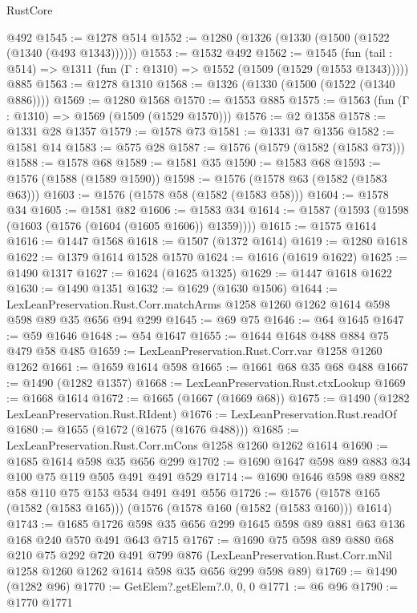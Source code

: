 \begin{lexlean}{RustCore}
\begin{coremodule}
    @492
@1545 := @1278 @514
@1552 := @1280 (@1326 (@1330 (@1500 (@1522 (@1340 (@493 @1343))))))
@1553 := @1532 @492
@1562 := @1545
    (fun (tail : @514) => @1311 (fun (Γ : @1310) => @1552 (@1509 (@1529 (@1553 @1343)))))
    @885
@1563 := @1278 @1310
@1568 := @1326 (@1330 (@1500 (@1522 (@1340 @886))))
@1569 := @1280 @1568
@1570 := @1553 @885
@1575 := @1563 (fun (Γ : @1310) => @1569 (@1509 (@1529 @1570)))
@1576 := @2 @1358
@1578 := @1331 @28 @1357
@1579 := @1578 @73
@1581 := @1331 @7 @1356
@1582 := @1581 @14
@1583 := @575 @28
@1587 := @1576 (@1579 (@1582 (@1583 @73)))
@1588 := @1578 @68
@1589 := @1581 @35
@1590 := @1583 @68
@1593 := @1576 (@1588 (@1589 @1590))
@1598 := @1576 (@1578 @63 (@1582 (@1583 @63)))
@1603 := @1576 (@1578 @58 (@1582 (@1583 @58)))
@1604 := @1578 @34
@1605 := @1581 @82
@1606 := @1583 @34
@1614 := @1587 (@1593 (@1598 (@1603 (@1576 (@1604 (@1605 @1606)) @1359))))
@1615 := @1575 @1614
@1616 := @1447 @1568
@1618 := @1507 (@1372 @1614)
@1619 := @1280 @1618
@1622 := @1379 @1614 @1528 @1570
@1624 := @1616 (@1619 @1622)
@1625 := @1490 @1317
@1627 := @1624 (@1625 @1325)
@1629 := @1447 @1618 @1622
@1630 := @1490 @1351
@1632 := @1629 (@1630 @1506)
@1644 := LexLeanPreservation.Rust.Corr.matchArms
    @1258
    @1260
    @1262
    @1614
    @598
    @598
    @89
    @35
    @656
    @94
    @299
@1645 := @69 @75
@1646 := @64 @1645
@1647 := @59 @1646
@1648 := @54 @1647
@1655 := @1644 @1648 @488 @884 @75 @479 @58 @485
@1659 := LexLeanPreservation.Rust.Corr.var @1258 @1260 @1262
@1661 := @1659 @1614 @598
@1665 := @1661 @68 @35 @68 @488
@1667 := @1490 (@1282 @1357)
@1668 := LexLeanPreservation.Rust.ctxLookup
@1669 := @1668 @1614
@1672 := @1665 (@1667 (@1669 @68))
@1675 := @1490 (@1282 LexLeanPreservation.Rust.RIdent)
@1676 := LexLeanPreservation.Rust.readOf
@1680 := @1655 (@1672 (@1675 (@1676 @488)))
@1685 := LexLeanPreservation.Rust.Corr.mCons @1258 @1260 @1262 @1614
@1690 := @1685 @1614 @598 @35 @656 @299
@1702 := @1690 @1647 @598 @89 @883 @34 @100 @75 @119 @505 @491 @491 @529
@1714 := @1690 @1646 @598 @89 @882 @58 @110 @75 @153 @534 @491 @491 @556
@1726 := @1576 (@1578 @165 (@1582 (@1583 @165))) (@1576 (@1578 @160 (@1582 (@1583 @160))) @1614)
@1743 := @1685 @1726 @598 @35 @656 @299 @1645 @598 @89 @881 @63 @136 @168 @240 @570 @491 @643 @715
@1767 := @1690
    @75
    @598
    @89
    @880
    @68
    @210
    @75
    @292
    @720
    @491
    @799
    @876
    (LexLeanPreservation.Rust.Corr.mNil @1258 @1260 @1262 @1614 @598 @35 @656 @299 @598 @89)
@1769 := @1490 (@1282 @96)
@1770 := GetElem?.getElem?.{0, 0, 0}
@1771 := @6 @96
@1790 := @1770
    @1771

\end{coremodule}
\end{lexlean}
